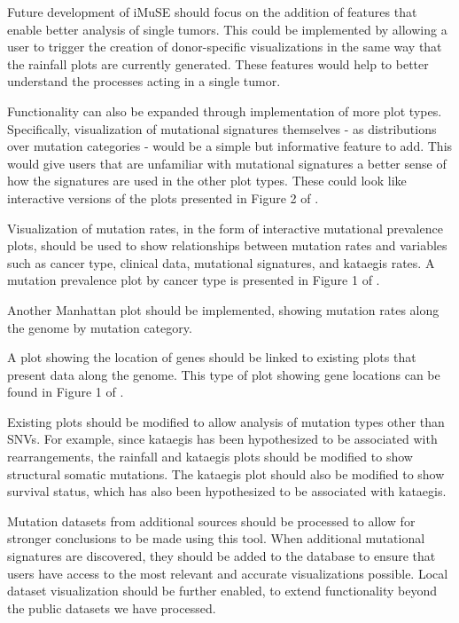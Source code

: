 \documentclass[12pt, letterpaper]{article}
\begin{document}
Future development of iMuSE should focus on the addition of features that enable better analysis of single tumors. 
This could be implemented by allowing a user to trigger the creation of donor-specific visualizations in the same way that the rainfall plots are currently generated.
These features would help to better understand the processes acting in a single tumor.

Functionality can also be expanded through implementation of more plot types.
Specifically, visualization of mutational signatures themselves - as distributions over mutation categories - would be a simple but informative feature to add.
This would give users that are unfamiliar with mutational signatures a better sense of how the signatures are used in the other plot types.
These could look like interactive versions of the plots presented in Figure 2 of \citet{alexandrov2013signatures}.

Visualization of mutation rates, in the form of interactive mutational prevalence plots, should be used to show relationships between mutation rates and variables such as cancer type, clinical data, mutational signatures, and kataegis rates.
A mutation prevalence plot by cancer type is presented in Figure 1 of \citet{alexandrov2013signatures}.

Another Manhattan plot should be implemented, showing mutation rates along the genome by mutation category.

A plot showing the location of genes should be linked to existing plots that present data along the genome.
This type of plot showing gene locations can be found in Figure 1 of \citet{chelaru2014epiviz}.

Existing plots should be modified to allow analysis of mutation types other than SNVs. 
For example, since kataegis has been hypothesized to be associated with rearrangements, the rainfall and kataegis plots should be modified to show structural somatic mutations. The kataegis plot should also be modified to show survival status, which has also been hypothesized to be associated with kataegis.

Mutation datasets from additional sources should be processed to allow for stronger conclusions to be made using this tool.
When additional mutational signatures are discovered, they should be added to the database to ensure that users have access to the most relevant and accurate visualizations possible.
Local dataset visualization should be further enabled, to extend functionality beyond the public datasets we have processed.
\end{document}
